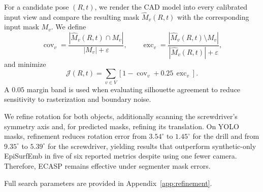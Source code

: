 \label{supp:silhouette_refinement}

For a candidate pose \((R,t)\), we render the CAD model into every calibrated
input view and compare the resulting mask \(\widehat{M}_v(R,t)\) with the
corresponding input mask \(M_v\).
We define
\[
\operatorname{cov}_v =
\frac{|\widehat{M}_v(R,t)\cap M_v|}{|M_v|+\varepsilon},
\qquad
\operatorname{exc}_v =
\frac{|\widehat{M}_v(R,t)\setminus M_v|}
{|\widehat{M}_v(R,t)|+\varepsilon},
\]
and minimize
\[
\mathcal{J}(R,t)
=
\sum_{v\in V}
\left[
1-\operatorname{cov}_v
+0.25\,\operatorname{exc}_v
\right].
\]
A \(0.05\) margin band is used when evaluating silhouette agreement to reduce
sensitivity to rasterization and boundary noise.

We refine rotation for both objects, additionally scanning the screwdriver's symmetry axis and, for predicted masks, refining its translation.
On YOLO masks, refinement reduces rotation error from \(3.54^\circ\) to
\(1.45^\circ\) for the drill and from \(9.35^\circ\) to \(5.39^\circ\) for the
screwdriver, yielding results that outperform synthetic-only EpiSurfEmb in five
of six reported metrics despite using one fewer camera. Therefore, ECASP remains effective under segmenter mask errors.

Full search parameters are provided in Appendix~\ref{app:refinement}.


